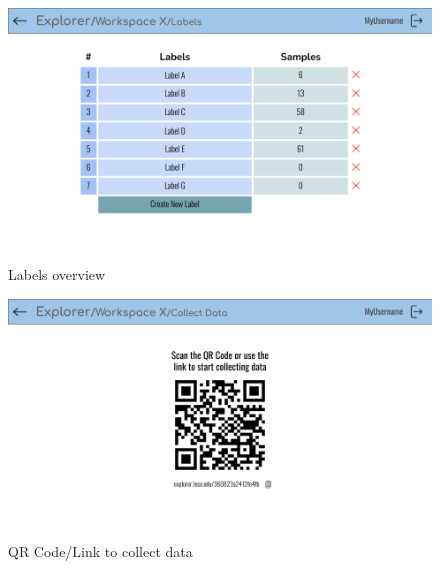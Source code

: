 \begin{figure}[h]
    \centering
    \begin{minipage}{.4\textwidth}
        \centering
        \includegraphics[width = \textwidth]{mockups/5.png}
        \caption{Labels overview}
        \label{fig:labels-overview}
    \end{minipage}
    \hfill
    \begin{minipage}{.4\textwidth}
        \centering
        \includegraphics[width = \textwidth]{mockups/6.png}
        \caption{QR Code/Link to collect data}
        \label{fig:workspaces-list}
    \end{minipage}
\end{figure}